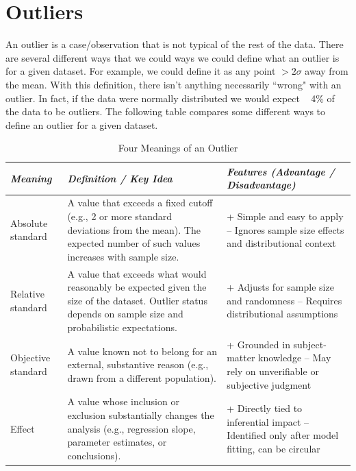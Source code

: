 \section{Outliers}

\medskip

An outlier is a case/observation that is not typical of the rest of the data. There are several different ways that we could ways we could define what an outlier is for a given dataset. For example, we could define it as any point $> 2 \sigma$ away from the mean. With this definition, there isn't anything necessarily ``wrong" with an outlier. In fact, if the data were normally distributed we would expect ~ 4\% of the data to be outliers. The following table compares some different ways to define an outlier for a given dataset.

\begin{table}[H]
\centering
\renewcommand{\arraystretch}{1.5}
\begin{tabularx}{0.95\textwidth}{
l
>{\hsize=1.1\hsize}X
>{\hsize=0.9\hsize}X
}
\toprule
\textit{Meaning} 
& \textit{Definition / Key Idea} 
& \textit{Features (Advantage / Disadvantage)} \\
\midrule
Absolute standard 
& A value that exceeds a fixed cutoff (e.g., 2 or more standard deviations from the mean). 
The expected number of such values increases with sample size. 
& + Simple and easy to apply \newline
-- Ignores sample size effects and distributional context \\

Relative standard 
& A value that exceeds what would reasonably be expected given the size of the dataset. 
Outlier status depends on sample size and probabilistic expectations. 
& + Adjusts for sample size and randomness \newline
-- Requires distributional assumptions \\

Objective standard 
& A value known not to belong for an external, substantive reason 
(e.g., drawn from a different population). 
& + Grounded in subject-matter knowledge \newline
-- May rely on unverifiable or subjective judgment \\

Effect 
& A value whose inclusion or exclusion substantially changes the analysis 
(e.g., regression slope, parameter estimates, or conclusions). 
& + Directly tied to inferential impact \newline
-- Identified only after model fitting, can be circular \\
\bottomrule
\end{tabularx}
\caption*{Four Meanings of an Outlier}
\end{table}

